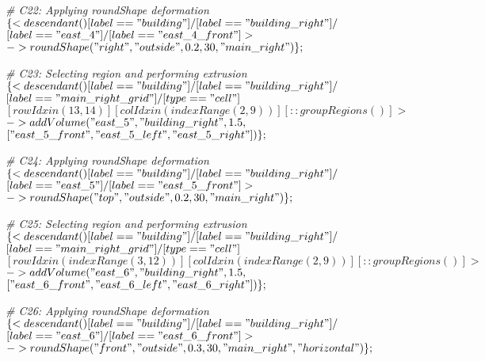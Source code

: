 \noindent \textit{\# C22: Applying roundShape deformation}\\
$\{< descendant() [label=="building"] / [label=="building\_right"] / $\\
$[label=="east\_4"] / [label=="east\_4\_front"] > $\\
$-> roundShape("right", "outside", 0.2, 30, "main\_right")\};$

\noindent \textit{\# C23: Selecting region and performing extrusion}\\
$\{< descendant() [label=="building"] / [label=="building\_right"] / $\\
$[label=="main\_right\_grid"] / [type=="cell"]$ \\
$[rowIdx in (13, 14)] [colIdx in (indexRange(2, 9))] [::groupRegions()] > $\\
$-> addVolume("east\_5", "building\_right", 1.5, $\\
$["east\_5\_front", "east\_5\_left", "east\_5\_right"])\};$

\noindent \textit{\# C24: Applying roundShape deformation}\\
$\{< descendant() [label=="building"] / [label=="building\_right"] / $\\
$[label=="east\_5"] / [label=="east\_5\_front"] > $\\
$-> roundShape("top", "outside", 0.2, 30, "main\_right")\};$

\noindent \textit{\# C25: Selecting region and performing extrusion}\\
$\{< descendant() [label=="building"] / [label=="building\_right"] / $\\
$[label=="main\_right\_grid"] / [type=="cell"] $\\
$[rowIdx in (indexRange(3, 12))] [colIdx in (indexRange(2, 9))] [::groupRegions()] > $\\
$-> addVolume("east\_6", "building\_right", 1.5, $\\
$["east\_6\_front", "east\_6\_left", "east\_6\_right"])\};$

\noindent \textit{\# C26: Applying roundShape deformation}\\
$\{< descendant() [label=="building"] / [label=="building\_right"] / $\\
$[label=="east\_6"] / [label=="east\_6\_front"] > $\\
$-> roundShape("front", "outside", 0.3, 30, "main\_right", "horizontal")\};$

\vspace{1cm}

